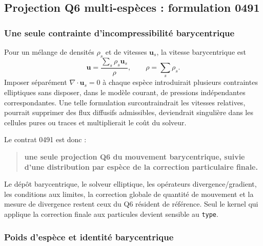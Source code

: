 \documentclass[11pt,a4paper]{article}
\begin{document}
\subsection{Projection Q6 multi-espèces : formulation 0491}

\subsubsection{Une seule contrainte d'incompressibilité barycentrique}

Pour un mélange de densités $\rho_s$ et de vitesses $\bm{u}_s$, la vitesse barycentrique est
\begin{equation}
  \bm{u}=\frac{\sum_s\rho_s\bm{u}_s}{\rho},
  \qquad \rho=\sum_s\rho_s.
\end{equation}
Imposer séparément $\nabla\cdot\bm{u}_s=0$ à chaque espèce introduirait plusieurs contraintes elliptiques sans disposer, dans le modèle courant, de pressions indépendantes correspondantes. Une telle formulation surcontraindrait les vitesses relatives, pourrait supprimer des flux diffusifs admissibles, deviendrait singulière dans les cellules pures ou traces et multiplierait le coût du solveur.

Le contrat 0491 est donc :
\begin{quote}
\textbf{une seule projection Q6 du mouvement barycentrique, suivie d'une distribution par espèce de la correction particulaire finale.}
\end{quote}
Le dépôt barycentrique, le solveur elliptique, les opérateurs divergence/gradient, les conditions aux limites, la correction globale de quantité de mouvement et la mesure de divergence restent ceux du Q6 résident de référence. Seul le kernel qui applique la correction finale aux particules devient sensible au \texttt{type}.

\subsubsection{Poids d'espèce et identité barycentrique}
\end{document}
